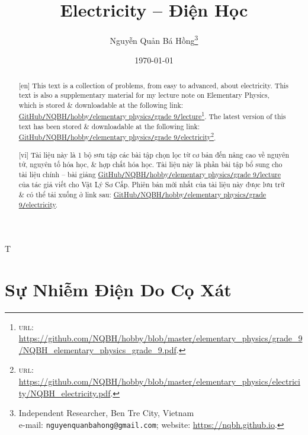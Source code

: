 \documentclass{article}
\title{Electricity -- Điện Học}
\author{Nguyễn Quản Bá Hồng\footnote{Independent Researcher, Ben Tre City, Vietnam\\e-mail: \texttt{nguyenquanbahong@gmail.com}; website: \url{https://nqbh.github.io}.}}
\date{\today}
\begin{document}
\maketitle
\begin{abstract}
	\textsf{[en]} This text is a collection of problems, from easy to advanced, about electricity. This text is also a supplementary material for my lecture note on Elementary Physics, which is stored \& downloadable at the following link: \href{https://github.com/NQBH/hobby/blob/master/elementary_physics/grade_9/NQBH_elementary_physics_grade_9.pdf}{GitHub\texttt{/}NQBH\texttt{/}hobby\texttt{/}elementary physics\texttt{/}grade 9\texttt{/}lecture}\footnote{\textsc{url}: \url{https://github.com/NQBH/hobby/blob/master/elementary_physics/grade_9/NQBH_elementary_physics_grade_9.pdf}.}. The latest version of this text has been stored \& downloadable at the following link:\\\href{https://github.com/NQBH/hobby/blob/master/elementary_physics/electricity/NQBH_electricity.pdf}{GitHub\texttt{/}NQBH\texttt{/}hobby\texttt{/}elementary physics\texttt{/}grade 9\texttt{/}electricity}\footnote{\textsc{url}: \url{https://github.com/NQBH/hobby/blob/master/elementary_physics/electricity/NQBH_electricity.pdf}.}.
	\vspace{2mm}
	
	\textsf{[vi]} Tài liệu này là 1 bộ sưu tập các bài tập chọn lọc từ cơ bản đến nâng cao về nguyên tử, nguyên tố hóa học, \& hợp chất hóa học. Tài liệu này là phần bài tập bổ sung cho tài liệu chính -- bài giảng \href{https://github.com/NQBH/hobby/blob/master/elementary_physics/grade_9/NQBH_elementary_physics_grade_9.pdf}{GitHub\texttt{/}NQBH\texttt{/}hobby\texttt{/}elementary physics\texttt{/}grade 9\texttt{/}lecture} của tác giả viết cho Vật Lý Sơ Cấp. Phiên bản mới nhất của tài liệu này được lưu trữ \& có thể tải xuống ở link sau: \href{https://github.com/NQBH/hobby/blob/master/elementary_physics/grade_9/real/NQBH_real.pdf}{GitHub\texttt{/}NQBH\texttt{/}hobby\texttt{/}elementary physics\texttt{/}grade 9\texttt{/}electricity}.
\end{abstract}
\setcounter{secnumdepth}{4}
\setcounter{tocdepth}{3}
\tableofcontents

T
\section{Sự Nhiễm Điện Do Cọ Xát}

\noindent{}
\end{document}
